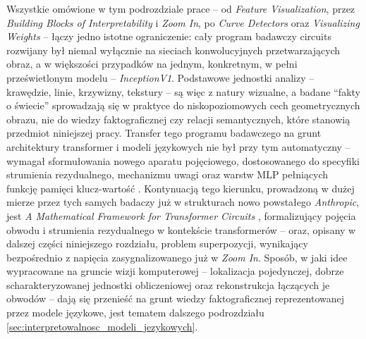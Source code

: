 \newline
Wszystkie omówione w tym podrozdziale prace -- od \textit{Feature Visualization}, przez \textit{Building Blocks of Interpretability} i \textit{Zoom In}, po \textit{Curve Detectors} oraz \textit{Visualizing Weights} -- łączy jedno istotne ograniczenie: cały program badawczy circuits rozwijany był niemal wyłącznie na sieciach konwolucyjnych przetwarzających obraz, a w większości przypadków na jednym, konkretnym, w pełni prześwietlonym modelu -- \textit{InceptionV1}. Podstawowe jednostki analizy -- krawędzie, linie, krzywizny, tekstury -- są więc z natury wizualne, a badane \enquote{fakty o świecie} sprowadzają się w praktyce do niskopoziomowych cech geometrycznych obrazu, nie do wiedzy faktograficznej czy relacji semantycznych, które stanowią przedmiot niniejszej pracy. Transfer tego programu badawczego na grunt architektury transformer i modeli językowych nie był przy tym automatyczny -- wymagał sformułowania nowego aparatu pojęciowego, dostosowanego do specyfiki strumienia rezydualnego, mechanizmu uwagi oraz warstw MLP pełniących funkcję pamięci klucz-wartość \cite{geva_2021_transformer_feedforward_key_value_memories}. Kontynuacją tego kierunku, prowadzoną w dużej mierze przez tych samych badaczy już w strukturach nowo powstałego \textit{Anthropic}, jest \textit{A Mathematical Framework for Transformer Circuits} \cite{elhage_2021_mathematical_framework_transformer_circuits}, formalizujący pojęcia obwodu i strumienia rezydualnego w kontekście transformerów -- oraz, opisany w dalszej części niniejszego rozdziału, problem superpozycji, wynikający bezpośrednio z napięcia zasygnalizowanego już w \textit{Zoom In}. Sposób, w jaki idee wypracowane na gruncie wizji komputerowej -- lokalizacja pojedynczej, dobrze scharakteryzowanej jednostki obliczeniowej oraz rekonstrukcja łączących je obwodów -- dają się przenieść na grunt wiedzy faktograficznej reprezentowanej przez modele językowe, jest tematem dalszego podrozdziału \ref{sec:interpretowalnosc_modeli_jezykowych}. \newline


